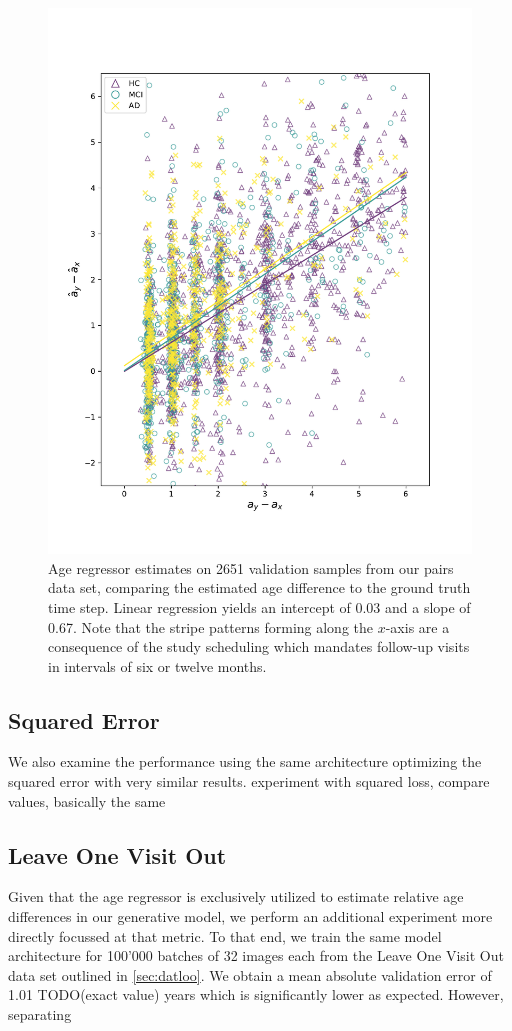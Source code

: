\begin{figure}
	\centering
	\includegraphics[width=.7\linewidth]{images/age_plots/d_dhat_real}
	\vspace*{-15pt}
	\caption{Age regressor estimates on 2651 validation samples from our pairs data set, comparing the estimated age difference to the ground truth time step. Linear regression yields an intercept of 0.03 and a slope of 0.67. Note that the stripe patterns forming along the $x$-axis are a consequence of the study scheduling which mandates follow-up visits in intervals of six or twelve months.}
	\label{fig:regddhatreal}
\end{figure}

\subsection*{Squared Error}
We also examine the performance using the same architecture optimizing the squared error with very similar results.
experiment with squared loss, compare values, basically the same

\subsection*{Leave One Visit Out}
Given that the age regressor is exclusively utilized to estimate relative age differences in our generative model, we perform an additional experiment more directly focussed at that metric. To that end, we train the same model architecture for 100'000 batches of 32 images each from the Leave One Visit Out data set outlined in \autoref{sec:datloo}. We obtain a mean absolute validation error of 1.01 TODO(exact value) years which is significantly lower as expected. However, separating 


